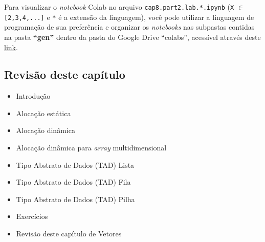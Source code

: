 \documentclass[12pt,a4paper]{article}
\providecommand{\tightlist}{%
      \setlength{\itemsep}{0pt}\setlength{\parskip}{0pt}}
\begin{document}
    Para visualizar o \emph{notebook} Colab no arquivo
\texttt{cap8.part2.lab.*.ipynb} (\texttt{X} \(\in\)
\texttt{{[}2,3,4,...{]}} e \texttt{*} é a extensão da linguagem), você
pode utilizar a linguagem de programação de sua preferência e organizar
os \emph{notebooks} nas subpastas contidas na pasta \textbf{``gen''}
dentro da pasta do Google Drive ``colabs'', acessível através deste
\href{https://drive.google.com/drive/folders/1YlFwv8XYN7PYYf-HwDMlkxzbmXzJw9cM?usp=sharing}{link}.

    \hypertarget{revisuxe3o-deste-capuxedtulo}{%
\subsection{Revisão deste capítulo}\label{revisuxe3o-deste-capuxedtulo}}

\begin{itemize}
\tightlist
\item
  Introdução
\item
  Alocação estática
\item
  Alocação dinâmica
\item
  Alocação dinâmica para \emph{array} multidimensional
\item
  Tipo Abstrato de Dados (TAD) Lista
\item
  Tipo Abstrato de Dados (TAD) Fila
\item
  Tipo Abstrato de Dados (TAD) Pilha
\item
  Exercícios
\item
  Revisão deste capítulo de Vetores
\end{itemize}


    
    
    
\end{document}
